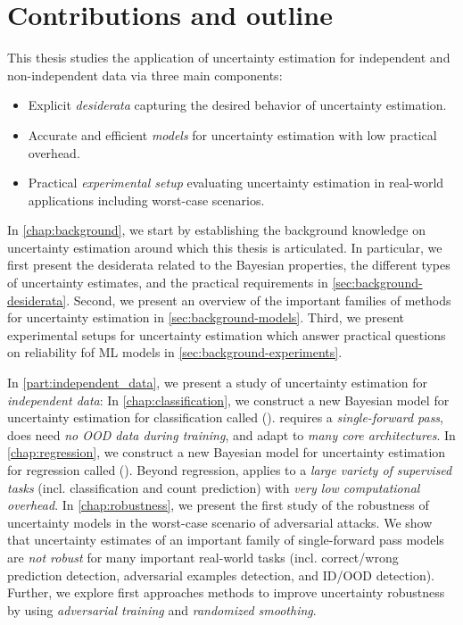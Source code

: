 \section{Contributions and outline}

This thesis studies the application of uncertainty estimation for independent and non-independent data via three main components:
\begin{itemize}
    \item Explicit \emph{desiderata} capturing the desired behavior of uncertainty estimation.
    \item Accurate and efficient \emph{models} for uncertainty estimation with low practical overhead.
    \item Practical \emph{experimental setup} evaluating uncertainty estimation in real-world applications including worst-case scenarios.
\end{itemize} 

In \cref{chap:background}, we start by establishing the background knowledge on uncertainty estimation around which this thesis is articulated. In particular, we first present the desiderata related to the Bayesian properties, the different types of uncertainty estimates, and the practical requirements in \cref{sec:background-desiderata}. Second, we present an overview of the important families of methods for uncertainty estimation in \cref{sec:background-models}. Third, we present experimental setups for uncertainty estimation which answer practical questions on reliability fof ML models in \cref{sec:background-experiments}. 

In \cref{part:independent_data}, we present a study of uncertainty estimation for \emph{independent data}: 
In \cref{chap:classification}, we construct a new Bayesian model for uncertainty estimation for classification called \PostNet{} (\PostNetacro{}). \PostNetacro{} requires a \emph{single-forward pass}, does need \emph{no OOD data during training}, and adapt to \emph{many core architectures}.
In \cref{chap:regression}, we construct a new Bayesian model for uncertainty estimation for regression called \NatPN{} (\NatPNacro{}). Beyond regression, \NatPNacro{} applies to a \emph{large variety of supervised tasks} (incl. classification and count prediction) with \emph{very low computational overhead}.
In \cref{chap:robustness}, we present the first study of the robustness of uncertainty models in the worst-case scenario of adversarial attacks. We show that uncertainty estimates of an important family of single-forward pass models are \emph{not robust} for many important real-world tasks (incl. correct/wrong prediction detection, adversarial examples detection, and ID/OOD detection). Further, we explore first approaches methods to improve uncertainty robustness by using \emph{adversarial training} and \emph{randomized smoothing}. 

